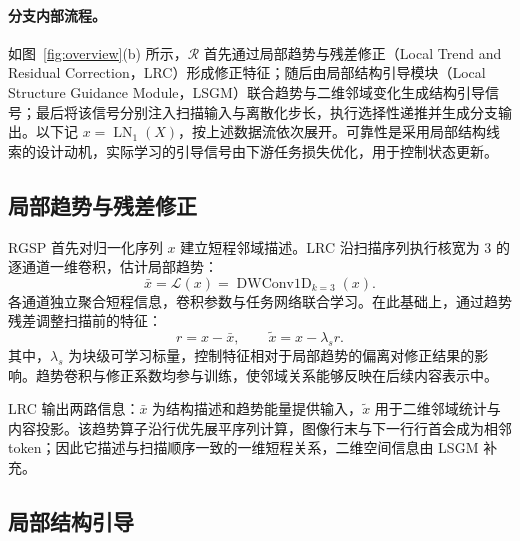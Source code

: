 \documentclass[UTF8,12pt,a4paper]{ctexart}
\begin{document}
\paragraph{分支内部流程。}
如图~\ref{fig:overview}(b) 所示，$\mathcal{R}$ 首先通过局部趋势与残差修正（Local Trend and Residual Correction，LRC）形成修正特征；随后由局部结构引导模块（Local Structure Guidance Module，LSGM）联合趋势与二维邻域变化生成结构引导信号；最后将该信号分别注入扫描输入与离散化步长，执行选择性递推并生成分支输出。以下记 $x=\operatorname{LN}_1(X)$，按上述数据流依次展开。可靠性是采用局部结构线索的设计动机，实际学习的引导信号由下游任务损失优化，用于控制状态更新。

\subsection{局部趋势与残差修正}
\label{sec:lrc}

RGSP 首先对归一化序列 $x$ 建立短程邻域描述。LRC 沿扫描序列执行核宽为 $3$ 的逐通道一维卷积，估计局部趋势：
\begin{equation}
\bar{x}=\mathcal{L}(x)=\operatorname{DWConv1D}_{k=3}(x).
\label{eq:local_trend}
\end{equation}
各通道独立聚合短程信息，卷积参数与任务网络联合学习。在此基础上，通过趋势残差调整扫描前的特征：
\begin{equation}
r=x-\bar{x},\qquad \tilde{x}=x-\lambda_s r.
\label{eq:residual}
\end{equation}
其中，$\lambda_s$ 为块级可学习标量，控制特征相对于局部趋势的偏离对修正结果的影响。趋势卷积与修正系数均参与训练，使邻域关系能够反映在后续内容表示中。

LRC 输出两路信息：$\bar{x}$ 为结构描述和趋势能量提供输入，$\tilde{x}$ 用于二维邻域统计与内容投影。该趋势算子沿行优先展平序列计算，图像行末与下一行行首会成为相邻 token；因此它描述与扫描顺序一致的一维短程关系，二维空间信息由 LSGM 补充。

\subsection{局部结构引导}
\label{sec:lsgm}
\end{document}
